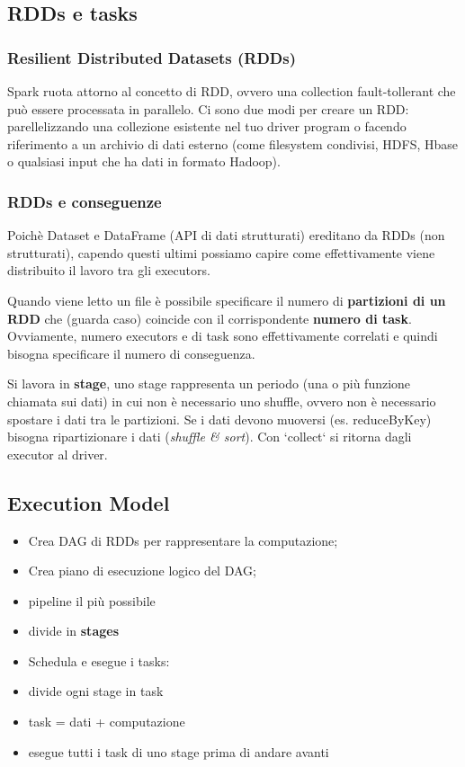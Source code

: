 \documentclass[12pt,italian]{article}
\begin{document}
\subsection{RDDs  e tasks}
\subsubsection{Resilient Distributed Datasets (RDDs)}
Spark ruota attorno al concetto di RDD, ovvero una collection fault-tollerant che può essere processata in parallelo. Ci sono due modi per creare un RDD: parellelizzando una collezione esistente nel tuo driver program o facendo riferimento a un archivio di dati esterno (come filesystem condivisi, HDFS, Hbase o qualsiasi input che ha dati in formato Hadoop).

\subsubsection{RDDs e conseguenze}
Poichè Dataset e DataFrame (API di dati strutturati) ereditano da RDDs (non strutturati), capendo questi ultimi possiamo capire come effettivamente viene distribuito il lavoro tra gli executors.

Quando viene letto un file è possibile specificare il numero di \textbf{partizioni di un RDD} che (guarda caso) coincide con il corrispondente \textbf{numero di task}.
Ovviamente, numero executors e di task sono effettivamente correlati e quindi bisogna specificare il numero di conseguenza.

Si lavora in \textbf{stage}, uno stage rappresenta un periodo (una o più funzione chiamata sui dati) in cui non è necessario uno shuffle, ovvero non è necessario spostare i dati tra le partizioni. Se i dati devono muoversi (es. reduceByKey) bisogna ripartizionare i dati (\textit{shuffle \& sort}).
Con `collect` si ritorna dagli executor al driver.


\subsection{Execution Model} %
\begin{itemize}
	\item Crea DAG di RDDs per rappresentare la computazione;
	\item Crea piano di esecuzione logico del DAG;
	\item pipeline il più possibile %
	\item divide in \textbf{stages}
	\item Schedula e esegue i tasks:
	\item divide ogni stage in task
	\item task = dati + computazione
	\item esegue tutti i task di uno stage prima di andare avanti
\end{itemize}
\end{document}
